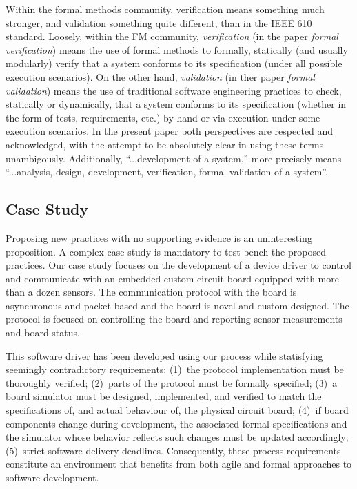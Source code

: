 \documentclass{article}
\begin{document}
Within the formal methods community, verification means something much stronger, and validation something quite different, than in the IEEE 610 standard.
Loosely, within the FM community, \emph{verification} (in the paper \emph{formal verification}) means the use of formal methods to formally, statically (and usually modularly) verify that a system conforms to its specification (under all possible execution scenarios).  
On the other hand, \emph{validation} (in ther paper \emph{formal validation}) means the use of traditional software engineering practices to check, statically or dynamically, that a system conforms to its specification (whether in the form of tests, requirements, etc.) by hand or via execution under some execution scenarios.
In the present paper both perspectives are respected and acknowledged, with the attempt to be absolutely clear in using these terms unambigously.
Additionally, ``...development of a system,'' more precisely means ``...analysis, design, development, verification, formal validation of a system''.



\subsection{Case Study}
\label{sec:case-study}

Proposing new practices with no supporting evidence is an uninteresting proposition.  
A complex case study is mandatory to test bench the proposed practices.  
Our case study focuses on the development of a device driver to control and communicate with an embedded custom circuit board equipped with more than a dozen sensors.
The communication protocol with the board is asynchronous and packet-based and the board is novel and custom-designed.  
The protocol is focused on controlling the board and reporting sensor measurements and board status.

This software driver has been developed using our process while statisfying seemingly contradictory requirements: (1)~the protocol implementation must be thoroughly verified; (2)~parts of the protocol must be formally specified; (3)~a board simulator must be designed, implemented, and verified to match the specifications of, and actual behaviour of, the physical circuit board; (4)~if board components change during development, the associated formal specifications and the simulator whose behavior reflects such changes must be updated accordingly; (5)~strict software delivery deadlines.  
Consequently, these process requirements constitute an environment that benefits from both agile and formal approaches to software development.
\end{document}
